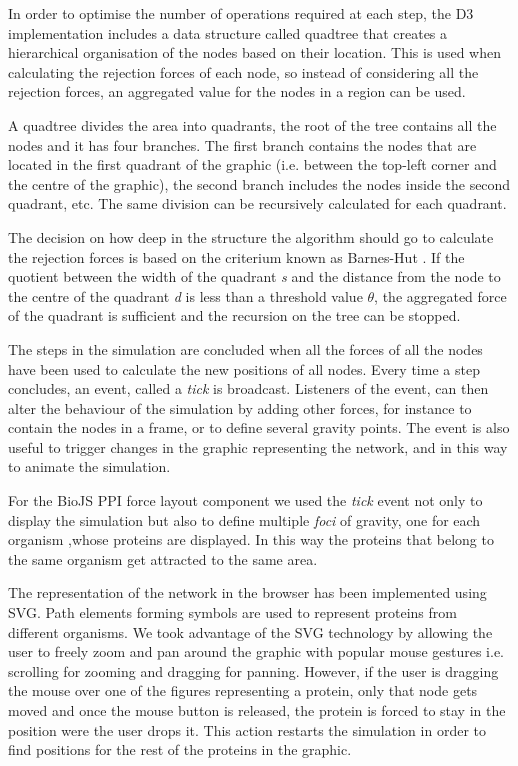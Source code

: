 In order to optimise the number of operations required at each step, the D3 implementation includes a data structure called quadtree that creates a hierarchical organisation of the nodes based on their location. This is used when calculating the rejection forces of each node, so instead of considering all the rejection forces, an aggregated value for the nodes in a region can be used.

A quadtree divides the area into quadrants, the root of the tree contains all the nodes and it has four branches. The first branch contains the nodes that are located in the first quadrant of the graphic (i.e. between the top-left corner and the centre of the graphic), the second branch includes the nodes inside the second quadrant, etc. The same division can be recursively calculated for each quadrant.

The decision on how deep in the structure the algorithm should go to calculate the rejection forces is based on the criterium known as Barnes-Hut \cite{BAR1986}. If the quotient between the width of the quadrant \emph{s} and the distance from the node to the centre of the quadrant \emph{d} is less than a threshold value $\theta$, the aggregated force of the quadrant is sufficient and the recursion on the tree can be stopped. 

The steps in the simulation are concluded when all the forces of all the nodes have been used to calculate the new positions of all nodes. Every time a step concludes, an event, called a \emph{tick} is broadcast. Listeners of the event, can then alter the behaviour of the simulation by adding other forces, for instance to contain the nodes in a frame, or to define several gravity points. The event is also useful to trigger changes in the graphic representing the network, and in this way to animate the simulation.

For the BioJS PPI force layout component we used the \emph{tick} event not only to display the simulation but also to  define multiple \emph{foci} of gravity, one for each organism ,whose proteins are displayed. In this way the proteins that belong to the same organism get attracted to the same area.

The representation of the network in the browser has been implemented using SVG. Path elements forming symbols are used to represent proteins from different organisms. We took advantage of the SVG technology by allowing the user to freely zoom and pan around the graphic with popular mouse gestures i.e. scrolling for zooming and dragging for panning. However, if the user is dragging the mouse over one of the figures representing a protein, only that node gets moved and once the mouse button is released, the protein is forced to stay in the position were the user drops it. This action restarts the simulation in  order to find positions for the rest of the proteins in the graphic.

